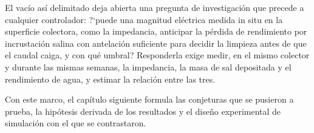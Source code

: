 El vac\'io as\'i delimitado deja abierta una pregunta de investigaci\'on que precede a cualquier controlador: ?`puede una magnitud el\'ectrica medida in situ en la superficie colectora, como la impedancia, anticipar la p\'erdida de rendimiento por incrustaci\'on salina con antelaci\'on suficiente para decidir la limpieza antes de que el caudal caiga, y con qu\'e umbral? Responderla exige medir, en el mismo colector y durante las mismas semanas, la impedancia, la masa de sal depositada y el rendimiento de agua, y estimar la relaci\'on entre las tres.

Con este marco, el cap\'itulo siguiente formula las conjeturas que se pusieron a prueba, la hip\'otesis derivada de los resultados y el dise\~no experimental de simulaci\'on con el que se contrastaron.
